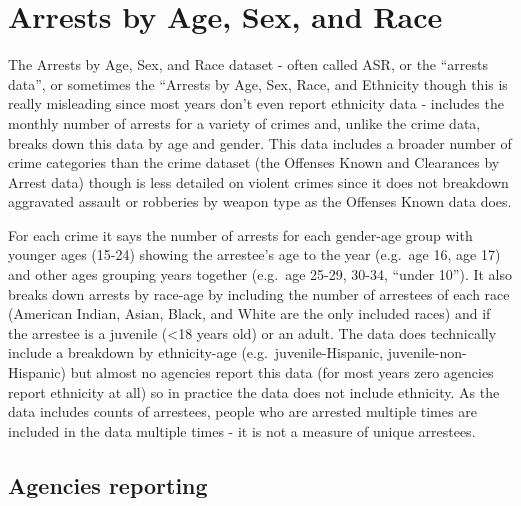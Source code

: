 \documentclass[
]{krantz}
\begin{document}
\chapter{Arrests by Age, Sex, and Race}\label{arrests}

The Arrests by Age, Sex, and Race dataset - often called
ASR, or the ``arrests data'', or sometimes the ``Arrests by
Age, Sex, Race, and Ethnicity though this is really
misleading since most years don't even report ethnicity data
- includes the monthly number of arrests for a variety of
crimes and, unlike the crime data, breaks down this data by
age and gender. This data includes a broader number of crime
categories than the crime dataset (the Offenses Known and
Clearances by Arrest data) though is less detailed on
violent crimes since it does not breakdown aggravated
assault or robberies by weapon type as the Offenses Known
data does.

For each crime it says the number of arrests for each
gender-age group with younger ages (15-24) showing the
arrestee's age to the year (e.g.~age 16, age 17) and other
ages grouping years together (e.g.~age 25-29, 30-34, ``under
10''). It also breaks down arrests by race-age by including
the number of arrestees of each race (American Indian,
Asian, Black, and White are the only included races) and if
the arrestee is a juvenile (\textless18 years old) or an
adult. The data does technically include a breakdown by
ethnicity-age (e.g.~juvenile-Hispanic,
juvenile-non-Hispanic) but almost no agencies report this
data (for most years zero agencies report ethnicity at all)
so in practice the data does not include ethnicity. As the
data includes counts of arrestees, people who are arrested
multiple times are included in the data multiple times - it
is not a measure of unique arrestees.

\section{Agencies reporting}\label{agencies-reporting-1}
\end{document}
